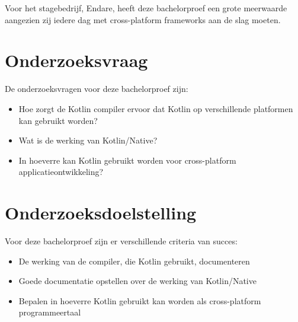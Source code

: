 Voor het stagebedrijf, Endare, heeft deze bachelorproef een grote meerwaarde aangezien zij iedere dag met cross-platform frameworks aan de slag moeten.


\section{Onderzoeksvraag}
\label{sec:onderzoeksvraag}
De onderzoeksvragen voor deze bachelorproef zijn: 
\begin{itemize}
	\item Hoe zorgt de Kotlin compiler ervoor dat Kotlin op verschillende platformen kan gebruikt worden?
	\item Wat is de werking van Kotlin/Native?
	\item In hoeverre kan Kotlin gebruikt worden voor cross-platform applicatieontwikkeling?
\end{itemize}

\section{Onderzoeksdoelstelling}
\label{sec:onderzoeksdoelstelling}
Voor deze bachelorproef zijn er verschillende criteria van succes:
\begin{itemize}
	\item De werking van de compiler, die Kotlin gebruikt, documenteren
	\item Goede documentatie opstellen over de werking van Kotlin/Native
	\item Bepalen in hoeverre Kotlin gebruikt kan worden als cross-platform programmeertaal
\end{itemize}

